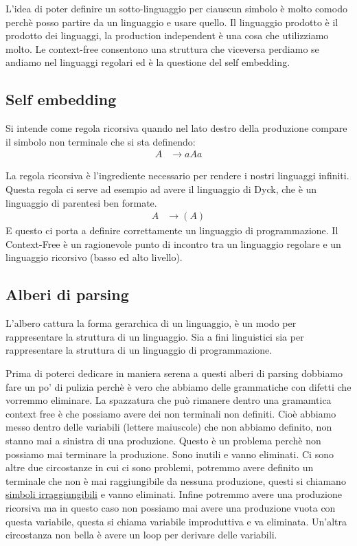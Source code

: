 L'idea di poter definire un sotto-linguaggio per ciauscun simbolo è molto comodo perchè posso partire da un linguaggio e usare quello.
Il linguaggio prodotto è il prodotto dei linguaggi, la production independent è una cosa che utilizziamo molto.
Le context-free consentono una struttura che viceversa perdiamo se andiamo nel linguaggi regolari ed è la questione del self embedding.

\subsection{Self embedding}
Si intende come regola ricorsiva quando nel lato destro della produzione compare il simbolo non terminale che si sta definendo:
\begin{align*}
    A &\to aAa
\end{align*}

La regola ricorsiva è l'ingrediente necessario per rendere i nostri linguaggi infiniti.
Questa regola ci serve ad esempio ad avere il linguaggio di Dyck, che è un linguaggio di parentesi ben formate.
\begin{align*}
    A &\to ( A ) 
\end{align*}
E questo ci porta a definire correttamente un linguaggio di programmazione.
Il Context-Free è un ragionevole punto di incontro tra un linguaggio regolare e un linguaggio ricorsivo (basso ed alto livello).

\subsection{Alberi di parsing}
L'albero cattura la forma gerarchica di un linguaggio, è un modo per rappresentare la struttura di un linguaggio. Sia a fini linguistici sia per rappresentare la struttura di un linguaggio di programmazione.

Prima di poterci dedicare in maniera serena a questi alberi di parsing dobbiamo fare un po' di pulizia perchè è vero che abbiamo delle grammatiche con difetti che vorremmo eliminare. La spazzatura che può rimanere dentro una gramamtica context free è che possiamo avere dei non terminali non definiti. Cioè abbiamo messo dentro delle variabili (lettere maiuscole) che non abbiamo definito, non stanno mai a sinistra di una produzione. Questo è un problema perchè non possiamo mai terminare la produzione. Sono inutili e vanno eliminati. Ci sono altre due circostanze in cui ci sono problemi, potremmo avere definito un terminale che non è mai raggiungibile da nessuna produzione, questi si chiamano \underline{simboli irraggiungibili} e vanno eliminati. Infine potremmo avere una produzione ricorsiva ma in questo caso non possiamo mai avere una produzione vuota con questa variabile, questa si chiama variabile improduttiva e va eliminata.
Un'altra circostanza non bella è avere un loop per derivare delle variabili.


